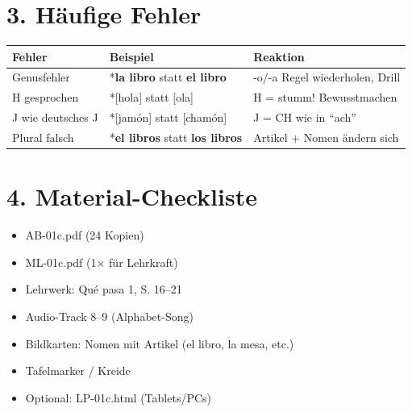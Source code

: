 \documentclass[11pt, a4paper]{article}
\newcommand{\fachfarbe}{spanisch}
\newcommand{\sequenz}{01}
\newcommand{\block}{c}
\newcommand{\lerngruppengroesse}{24}
\newcommand{\es}[1]{\textcolor{\fachfarbe}{\textbf{#1}}}
\begin{document}
\section*{3. Häufige Fehler}

\begin{fehlerbox}
\begin{tabularx}{\textwidth}{|l|X|X|}
\hline
\textbf{Fehler} & \textbf{Beispiel} & \textbf{Reaktion} \\
\hline
Genusfehler & *\es{la libro} statt \es{el libro} & -o/-a Regel wiederholen, Drill \\
\hline
H gesprochen & *[hola] statt [ola] & H = stumm! Bewusstmachen \\
\hline
J wie deutsches J & *[jamón] statt [chamón] & J = CH wie in ``ach'' \\
\hline
Plural falsch & *\es{el libros} statt \es{los libros} & Artikel + Nomen ändern sich \\
\hline
\end{tabularx}
\end{fehlerbox}


\section*{4. Material-Checkliste}

\begin{materialbox}
\begin{itemize}[label=$\square$]
    \item AB-\sequenz\block.pdf (\lerngruppengroesse{} Kopien)
    \item ML-\sequenz\block.pdf (1× für Lehrkraft)
    \item Lehrwerk: Qué pasa 1, S. 16--21
    \item Audio-Track 8--9 (Alphabet-Song)
    \item Bildkarten: Nomen mit Artikel (el libro, la mesa, etc.)
    \item Tafelmarker / Kreide
    \item Optional: LP-\sequenz\block.html (Tablets/PCs)
\end{itemize}
\end{materialbox}

\end{document}
